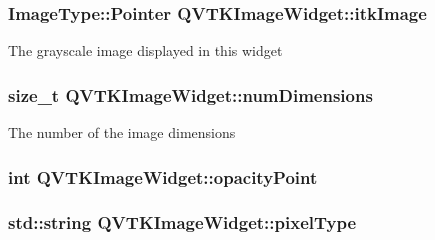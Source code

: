 \hypertarget{class_q_v_t_k_image_widget_ae5b308466d4f198990b9d132319f9f34}{
\subsubsection[{itk\-Image}]{\setlength{\rightskip}{0pt plus 5cm}Image\-Type\-::\-Pointer {\bf Q\-V\-T\-K\-Image\-Widget\-::itk\-Image}}}\label{d8/dd7/class_q_v_t_k_image_widget_ae5b308466d4f198990b9d132319f9f34}
The grayscale image displayed in this widget \hypertarget{class_q_v_t_k_image_widget_a6aff403421ea538248d48116a942271b}{
\subsubsection[{num\-Dimensions}]{\setlength{\rightskip}{0pt plus 5cm}size\-\_\-t {\bf Q\-V\-T\-K\-Image\-Widget\-::num\-Dimensions}}}\label{d8/dd7/class_q_v_t_k_image_widget_a6aff403421ea538248d48116a942271b}
The number of the image dimensions \hypertarget{class_q_v_t_k_image_widget_a70f1f3fa834da5feccd14b9373c3b2c0}{
\subsubsection[{opacity\-Point}]{\setlength{\rightskip}{0pt plus 5cm}int {\bf Q\-V\-T\-K\-Image\-Widget\-::opacity\-Point}}}\label{d8/dd7/class_q_v_t_k_image_widget_a70f1f3fa834da5feccd14b9373c3b2c0}
\hypertarget{class_q_v_t_k_image_widget_a067b78e68ed458d840ad1cf0d16b4ad6}{
\subsubsection[{pixel\-Type}]{\setlength{\rightskip}{0pt plus 5cm}std\-::string {\bf Q\-V\-T\-K\-Image\-Widget\-::pixel\-Type}}}\label{d8/dd7/class_q_v_t_k_image_widget_a067b78e68ed458d840ad1cf0d16b4ad6}

